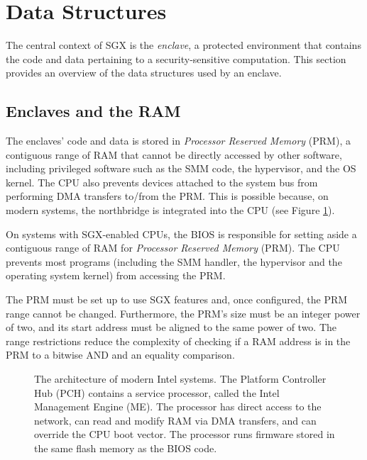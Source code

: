 \section{Data Structures}
\label{sec:enclaves}

The central context of SGX is the \textit{enclave}, a protected environment
that contains the code and data pertaining to a security-sensitive computation.
This section provides an overview of the data structures used by an enclave.


\subsection{Enclaves and the RAM}


The enclaves' code and data is stored in \textit{Processor Reserved Memory}
(PRM), a contiguous range of RAM that cannot be directly accessed by other
software, including privileged software such as the SMM code, the hypervisor,
and the OS kernel. The CPU also prevents devices attached to the system bus
from performing DMA transfers to/from the PRM. This is possible because, on
modern systems, the northbridge is integrated into the CPU
(see Figure \ref{fig:pch}).

On systems with SGX-enabled CPUs, the BIOS is responsible for setting aside a
contiguous range of RAM for \textit{Processor Reserved Memory} (PRM). The
CPU prevents most programs (including the SMM handler, the hypervisor and the
operating system kernel) from accessing the PRM.


The PRM must be set up to use SGX features and, once configured, the PRM range
cannot be changed. Furthermore, the PRM's size must be an integer power of two,
and its start address must be aligned to the same power of two. The range
restrictions reduce the complexity of checking if a RAM address is in the PRM
to a bitwise AND and an equality comparison.

\begin{figure}[hbtp]
  \caption{
    The architecture of modern Intel systems.
    The Platform Controller Hub (PCH) contains a service processor, called the
    Intel Management Engine (ME). The processor has direct access to the
    network, can read and modify RAM via DMA transfers, and can override the
    CPU boot vector. The processor runs firmware stored in the same flash
    memory as the BIOS code.
  }
  \label{fig:pch}
\end{figure}

